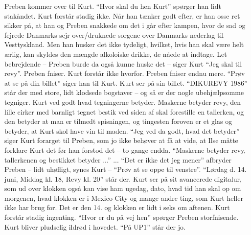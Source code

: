 \documentclass[a4paper,11pt]{article}
\begin{document}
\begin{sketch}
Preben kommer over til Kurt. ``Hvor skal du hen Kurt'' spørger han lidt
stakåndet. Kurt forstår stadig ikke. Når han tænker godt efter, er han osse ret
sikker på, at han og Preben snakkede om det i går efter kampen, hvor de sad og
fejrede Danmarks sejr over/druknede sorgene over Danmarks nederlag til
Vesttyskland. Men han husker det ikke tydeligt, hvilket, hvis han skal være helt
ærlig, kan skyldes den mængde alkoloiske drikke, de nåede at indtage. Let
bebrejdende -- Preben burde da også kunne huske det -- siger Kurt ``Jeg skal til
revy''. Preben fniser. Kurt forstår ikke hvorfor. Preben fniser endnu
mere. ``Prøv at se på din billet'' siger han til Kurt. Kurt ser på sin
billet. ``DIKUREVY 1986'' står der med store, lidt klodsede bogstaver -- og så
er der nogle ubehjælpsomme tegniger. Kurt ved godt hvad tegningerne
betyder. Maskerne betyder revy, den lille cirker med barnligt tegnet bestik ved
siden af skal forestille en tallerken, og den betyder at man er tilmedt
spisningen, og tingesten foroven er et glas og betyder, at Kurt skol have vin
til maden. ``Jeg ved da godt, hvad det betyder'' siger Kurt forarget til Preben,
som jo ikke behøver at få at vide, at Ilse måtte forklare Kurt det før han
forstod det -- to gange endda. ``Maskerne betyder revy, tallerkenen og bestikket
betyder ...'' ...  ``Det er ikke det jeg mener'' afbryder Preben -- lidt
uhøfligt, synes Kurt -- ``Prøv at se oppe til venstre''. ``Lørdag d. 14. juni,
Middag kl. 18, Revy kl. 20'' står der. Kurt ser på sit avancerede digitalur, som
ud over klokken også kan vise ham ugedag, dato, hvad tid han skal op om
morgenen, hvad klokken er i Mexico City og mange andre ting, som Kurt heller
ikke har brug for. Det er den 14. og klokken er lidt i seks om aftenen. Kurt
forstår stadig ingenting. ``Hvor er du på vej hen'' spørger Preben
storfnisende. Kurt bliver pludselig ildrød i hovedet. ``På UP1'' står der jo.


\end{sketch}
\end{document}
